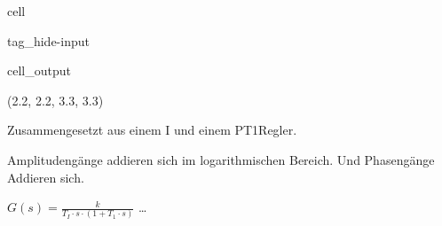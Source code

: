 \documentclass[letterpaper,10pt,english]{jupyterBook}
\begin{document}
\begin{sphinxuseclass}{cell}
\begin{sphinxuseclass}{tag_hide-input}\begin{sphinxVerbatimOutput}

\begin{sphinxuseclass}{cell_output}
\begin{sphinxVerbatim}[commandchars=\\\{\}]
(\PYGZhy{}2.2, 2.2, \PYGZhy{}3.3, 3.3)
\end{sphinxVerbatim}

\noindent{}

\end{sphinxuseclass}\end{sphinxVerbatimOutput}

\end{sphinxuseclass}
\end{sphinxuseclass}
\begin{DUlineblock}{0em}
\item[] 
\end{DUlineblock}

\sphinxAtStartPar
Zusammengesetzt aus einem I\sphinxhyphen{} und einem PT1\sphinxhyphen{}Regler.

\sphinxAtStartPar
Amplitudengänge addieren sich im logarithmischen Bereich.
Und Phasengänge Addieren sich.

\sphinxAtStartPar
\(G(s) = \frac{k}{T_I\cdot s\cdot(1 + T_1\cdot s)}\)
…
\end{document}
